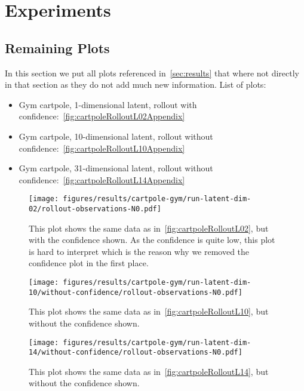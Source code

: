 \chapter{Experiments}



\section{Remaining Plots}
	\label{app:remainingPlots}

	In this section we put all plots referenced in~\autoref{sec:results} that where not directly in that section as they do not add much new information. List of plots:
	\begin{itemize}
		\item Gym cartpole, 1-dimensional latent, rollout with confidence:~\autoref{fig:cartpoleRolloutL02Appendix}
		\item Gym cartpole, 10-dimensional latent, rollout without confidence:~\autoref{fig:cartpoleRolloutL10Appendix}
		\item Gym cartpole, 31-dimensional latent, rollout without confidence:~\autoref{fig:cartpoleRolloutL14Appendix}
	\end{itemize}

	\begin{figure}
		\centering
		\texttt{[image: figures/results/cartpole-gym/run-latent-dim-02/rollout-observations-N0.pdf]}
		\caption{This plot shows the same data as in~\autoref{fig:cartpoleRolloutL02}, but with the confidence shown. As the confidence is quite low, this plot is hard to interpret which is the reason why we removed the confidence plot in the first place.}
		\label{fig:cartpoleRolloutL02Appendix}
	\end{figure}

	\begin{figure}
		\centering
		\texttt{[image: figures/results/cartpole-gym/run-latent-dim-10/without-confidence/rollout-observations-N0.pdf]}
		\caption{This plot shows the same data as in~\autoref{fig:cartpoleRolloutL10}, but without the confidence shown.}
		\label{fig:cartpoleRolloutL10Appendix}
	\end{figure}

	\begin{figure}
		\centering
		\texttt{[image: figures/results/cartpole-gym/run-latent-dim-14/without-confidence/rollout-observations-N0.pdf]}
		\caption{This plot shows the same data as in~\autoref{fig:cartpoleRolloutL14}, but without the confidence shown.}
		\label{fig:cartpoleRolloutL14Appendix}
	\end{figure}
